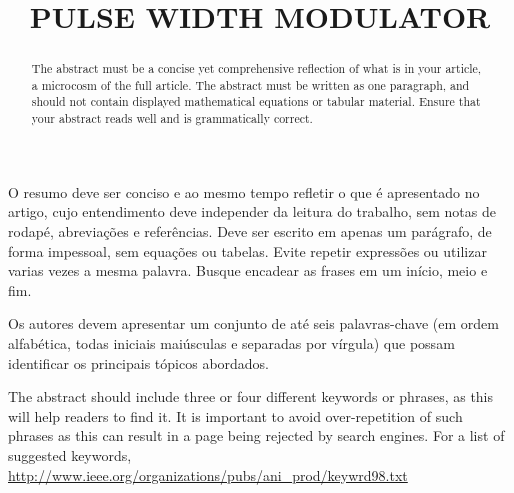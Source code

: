 
\title{PULSE WIDTH MODULATOR} %

\maketitle




\begin{resumo}  O resumo deve ser conciso e ao mesmo tempo refletir o que é apresentado no artigo, cujo entendimento deve independer da leitura do trabalho, sem notas de rodapé, abreviações e referências. Deve ser escrito em apenas um parágrafo, de forma impessoal, sem equações ou tabelas. Evite repetir expressões ou utilizar varias vezes a mesma palavra. Busque encadear as frases em um início, meio e fim.
\end{resumo}

\begin{palavraschave }
		Os autores devem apresentar um conjunto de até seis palavras-chave (em ordem alfabética, todas iniciais maiúsculas e separadas por vírgula) que possam identificar os principais tópicos abordados.	
\end{palavraschave }

\englishtitle

\begin{abstract}
	The abstract must be a concise yet comprehensive reflection of what is in your article, a microcosm of the full article. The abstract must be written as one paragraph, and should not contain displayed mathematical equations or tabular material.  Ensure that your abstract reads well and is grammatically correct.
\end{abstract}

\begin{keywords}
	The abstract should include three or four different keywords or phrases, as this will help readers to find it. It is important to avoid over-repetition of such phrases as this can result in a page being rejected by search engines. For a list of suggested keywords, \url{http://www.ieee.org/organizations/pubs/ani_prod/keywrd98.txt}
\end{keywords}


